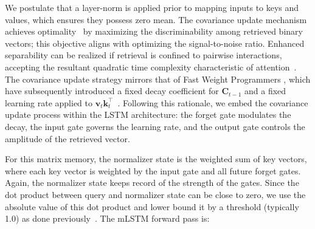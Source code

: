 We postulate that a layer-norm is applied prior to mapping inputs to keys and values, which ensures they possess zero mean. The covariance update mechanism achieves optimality~\citep{Dayan:91} by maximizing the discriminability among retrieved binary vectors; this objective aligns with optimizing the signal-to-noise ratio. Enhanced separability can be realized if retrieval is confined to pairwise interactions, accepting the resultant quadratic time complexity characteristic of attention~\citep{Krotov:16,Krotov:17,Ramsauer:21}. The covariance update strategy mirrors that of Fast Weight Programmers \citep{Schmidhuber:92ncfastweights,Schlag:21}, which have subsequently introduced a fixed decay coefficient for $\mathbf{C}_{t-1}$ and a fixed learning rate applied to $\mathbf{v}_{t} \mathbf{k}_t ^\top$~\citep{Ba:16}. Following this rationale, we embed the covariance update process within the LSTM architecture: the forget gate modulates the decay, the input gate governs the learning rate, and the output gate controls the amplitude of the retrieved vector.

For this matrix memory, the normalizer state is the weighted sum of key vectors, where each key vector is weighted by the input gate and all future forget gates. Again, the normalizer state keeps record of the strength of the gates. Since the dot product between query and normalizer state can be close to zero, we use the absolute value of this dot product and lower bound it by a threshold (typically 1.0) as done previously~\citep{Sun:23arxiv}. The mLSTM forward pass is:

